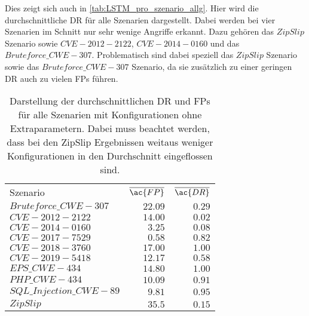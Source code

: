     Dies zeigt sich auch in \autoref{tab:LSTM_pro_szenario_allg}. 
    Hier wird die durchschnittliche \ac{DR} für alle Szenarien dargestellt.
    Dabei werden bei vier Szenarien im Schnitt nur sehr wenige Angriffe erkannt.
    Dazu gehören das $ZipSlip$ Szenario sowie $CVE-2012-2122$, $CVE-2014-0160$ und das $Bruteforce\_CWE-307$.
    Problematisch sind dabei speziell das $ZipSlip$ Szenario sowie das $Bruteforce\_CWE-307$ Szenario, da sie zusätzlich zu einer geringen \ac{DR} auch zu vielen \acp{FP} führen.
    \begin{table}[H]
        \centering
        \begin{tabular}{lrr}
            \hline
            \rowcolor{GruvGray!36}
            \multicolumn{3}{c}{Ohne Extraparameter - pro Szenario}\\
            \toprule
            Szenario & $\overline{\ac{FP}}$ & $\overline{\ac{DR}}$ \\
            \midrule
            \rowcolor{GruvGray!16}
            $Bruteforce\_CWE-307$  &$22.09$ & 	$0.29$ \\
            $CVE-2012-2122$        &$14.00$ & 	$0.02$ \\
            \rowcolor{GruvGray!16}
            $CVE-2014-0160$        &$3.25$ & 	$0.08$ \\
            $CVE-2017-7529$       &$0.58$  & 	$0.82$ \\
            \rowcolor{GruvGray!16}
            $CVE-2018-3760$        &$17.00$ & 	$1.00$ \\
            $CVE-2019-5418$       &$12.17$  & 	$0.58$ \\
            \rowcolor{GruvGray!16}
            $EPS\_CWE-434$         &$14.80$ & 	$1.00$ \\
            $PHP\_CWE-434$         &$10.09$ & 	$0.91$ \\
            \rowcolor{GruvGray!16}
            $SQL\_Injection\_CWE-89$&$9.81$ & 	$0.95$ \\
            \rowcolor{CTred!16}
            $ZipSlip$              &$35.5$ & $0.15$ \\
            \hline
        \end{tabular}
        \caption[Durschnittliche Ergebnisse auf Szenarien aufgeschlüsselt]{Darstellung der durchschnittlichen \ac{DR} und \acp{FP} für alle Szenarien mit Konfigurationen ohne Extraparametern.
        Dabei muss beachtet werden, dass bei den ZipSlip Ergebnissen weitaus weniger Konfigurationen in den Durchschnitt eingeflossen sind.}
        \label{tab:LSTM_pro_szenario_allg}
    \end{table}


